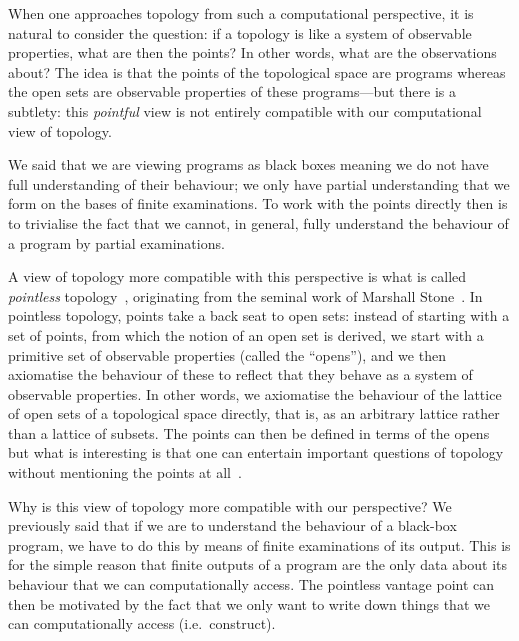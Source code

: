 When one approaches topology from such a computational perspective, it is natural to
consider the question: if a topology is like a system of observable properties, what are
then the points? In other words, what are the observations about? The idea is that the
points of the topological space are programs whereas the open sets are observable
properties of these programs---but there is a subtlety: this \emph{pointful} view is not
entirely compatible with our computational view of topology.

We said that we are viewing programs as black boxes meaning we do not have full
understanding of their behaviour; we only have partial understanding that we form on the
bases of finite examinations. To work with the points directly then is to trivialise the
fact that we cannot, in general, fully understand the behaviour of a program by partial
examinations.

A view of topology more compatible with this perspective is what is called
\emph{pointless} topology~\cite{johnstone-the-point}, originating from the seminal work of
Marshall Stone~\cite{stone-original}. In pointless topology, points take a back seat to
open sets: instead of starting with a set of points, from which the notion of an open set
is derived, we start with a primitive set of observable properties (called the ``opens''),
and we then axiomatise the behaviour of these to reflect that they behave as a system of
observable properties. In other words, we axiomatise the behaviour of the lattice of open
sets of a topological space directly, that is, as an arbitrary lattice rather than a
lattice of subsets. The points can then be defined in terms of the opens but what is
interesting is that one can entertain important questions of topology without mentioning
the points at all~\cite{johnstone-the-point}.

Why is this view of topology more compatible with our perspective? We previously said that
if we are to understand the behaviour of a black-box program, we have to do this by means
of finite examinations of its output. This is for the simple reason that finite outputs of
a program are the only data about its behaviour that we can computationally access. The
pointless vantage point can then be motivated by the fact that we only want to write down
things that we can computationally access (i.e.~construct).

